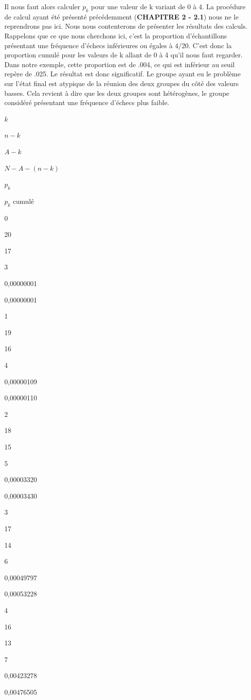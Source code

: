 \documentclass[]{book}
\theoremstyle{definition}
\theoremstyle{definition}
\theoremstyle{definition}
\theoremstyle{remark}
\begin{document}
Il nous faut alors calculer \(p_{k}\) pour une valeur de k variant de 0
à 4. La procédure de calcul ayant été présenté précédemment
(\textbf{CHAPITRE 2 - 2.1}) nous ne le reprendrons pas ici. Nous nous
contenterons de présenter les résultats des calculs. Rappelons que ce
que nous cherchons ici, c'est la proportion d'échantillons présentant
une fréquence d'échecs inférieures ou égales à 4/20. C'est donc la
proportion cumulé pour les valeurs de k allant de 0 à 4 qu'il nous faut
regarder. Dans notre exemple, cette proportion est de .004, ce qui est
inférieur au seuil repère de .025. Le résultat est donc significatif. Le
groupe ayant eu le problème sur l'état final est atypique de la réunion
des deux groupes du côté des valeurs basses. Cela revient à dire que les
deux groupes sont hétérogènes, le groupe considéré présentant une
fréquence d'échecs plus faible.

\(k\)

\(n-k\)

\(A-k\)

\(N-A-(n-k)\)

\(p_{k}\)

\(p_{k}\) cumulé

0

20

17

3

0,00000001

0,00000001

1

19

16

4

0,00000109

0,00000110

2

18

15

5

0,00003320

0,00003430

3

17

14

6

0,00049797

0,00053228

4

16

13

7

0,00423278

0,00476505
\end{document}

